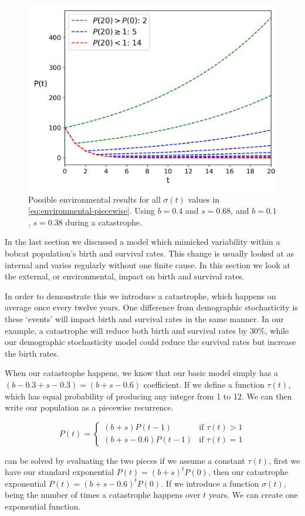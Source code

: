 \documentclass{article}
\begin{document}
\begin{figure}[b]
    \centering
    \includegraphics[width=.5\linewidth]{plots/environmental_classes.png}
    \caption{Possible environmental results for all $\sigma(t)$ values in \cref{eq:environmental-piecewise}. Using $b = 0.4$ and $s = 0.68$, and $b = 0.1$, $s = 0.38$ during a catastrophe.}
    \label{fig:environmental-classes}
\end{figure}

In the last section we discussed a model which mimicked variability within a bobcat population's birth and survival rates. This change is usually looked at as internal and varies regularly without one finite cause. In this section we look at the external, or environmental, impact on birth and survival rates.

In order to demonstrate this we introduce a catastrophe, which happens on average once every twelve years. One difference from demographic stochasticity is these `events' will impact birth and survival rates in the same manner. In our example, a catastrophe will reduce both birth and survival rates by 30\%, while our demographic stochasticity model could reduce the survival rates but increase the birth rates.

When our catastrophe happens, we know that our basic model simply has a \\$(b-0.3 + s-0.3)=(b+s - 0.6)$ coefficient. If we define a function $\tau(t)$, which has equal probability of producing any integer from 1 to 12. We can then write our population as a piecewise recurrence.

\begin{equation} \label{eq:environmental-piecewise}
    P(t)=\begin{cases}
        (b+s)P(t-1) & \text{if } \tau(t) > 1 \\
        (b+s-0.6)P(t-1) & \text{if } \tau(t) = 1
    \end{cases}
\end{equation}

 can be solved by evaluating the two pieces if we assume a constant $\tau(t)$, first we have our standard exponential $P(t)=(b+s)^tP(0)$, then our catastrophe exponential $P(t)=(b+s-0.6)^tP(0)$. If we introduce a function $\sigma(t)$, being the number of times a catastrophe happens over $t$ years. We can create one exponential function.
\end{document}
